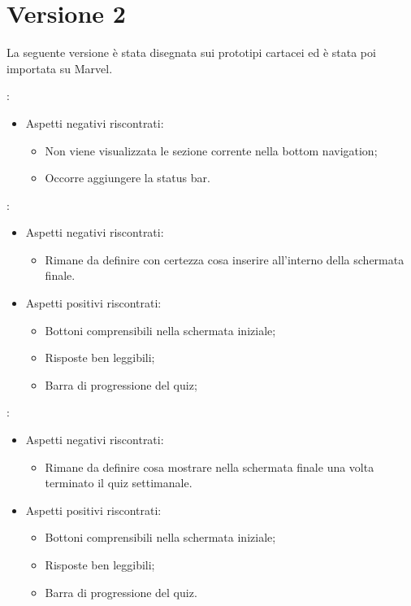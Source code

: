 \documentclass{article}
\begin{document}
\section{Versione 2}
La seguente versione è stata disegnata sui prototipi cartacei ed è stata poi importata su Marvel.
\begin{description}
\addtolength{\itemindent}{0.5cm}
\item [Generale] :
	\begin{itemize}
	\item Aspetti negativi riscontrati:
		\begin{itemize}
		\item Non viene visualizzata le sezione corrente nella bottom navigation;
		\item Occorre aggiungere la status bar.
	\end{itemize}
	\end{itemize}
	
\item [Quiz Giornaliero] :
\begin{itemize}
	\item Aspetti negativi riscontrati:
		\begin{itemize}
		\item Rimane da definire con certezza cosa inserire all’interno della schermata finale.
        \end{itemize}
	\item Aspetti positivi riscontrati:
		\begin{itemize}
        \item Bottoni comprensibili nella schermata iniziale;
        \item Risposte ben leggibili;
        \item Barra di progressione del quiz;
        \end{itemize}
	\end{itemize}
\item [Quiz Settimanale]:
	\begin{itemize}
	\item Aspetti negativi riscontrati:
		\begin{itemize}
		\item Rimane da definire cosa mostrare nella schermata finale una volta terminato il quiz settimanale.
	\end{itemize}
	\item Aspetti positivi riscontrati:
	\begin{itemize}
		\item Bottoni comprensibili nella schermata iniziale;
		\item Risposte ben leggibili;
		\item Barra di progressione del quiz.
	\end{itemize}
\end{itemize}


\end{description}
\end{document}

